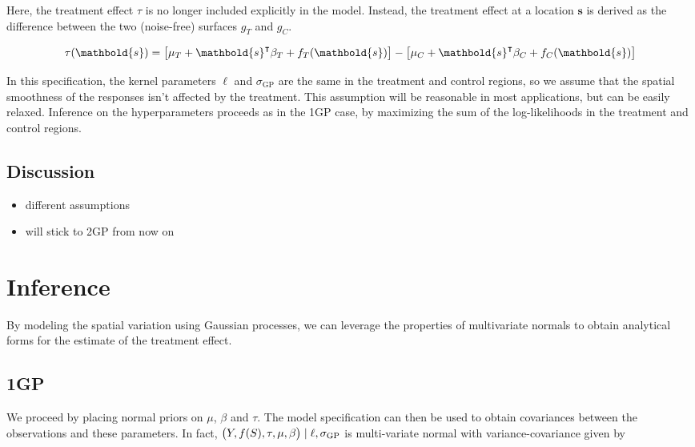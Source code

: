 \documentclass[letter]{article}
\providecommand{\tightlist}{%
      \setlength{\itemsep}{0pt}\setlength{\parskip}{0pt}}
\newcommand{\trans}{^{\intercal}}
\newcommand{\sigmaf}{\sigma_{\mathrm{GP}}}
\newcommand{\svec}{\mathbold{s}}
\providecommand{\tightlist}{%
  	  \setlength{\itemsep}{0pt}\setlength{\parskip}{0pt}}
\begin{document}
Here, the treatment effect \(\tau\) is no longer included explicitly in the model. Instead, the treatment effect at a location \(\svec\) is derived as the difference between the two (noise-free) surfaces \(g_T\) and \(g_C\).

\begin{equation}
\tau(\svec) = \sbr{\mu_T + \svec\trans\beta_T + f_T(\svec)} - \sbr{\mu_C + \svec\trans\beta_C + f_C(\svec)}
\end{equation}

In this specification, the kernel parameters \(\ell\) and \(\sigmaf\) are the same in the treatment and control regions, so we assume that the spatial smoothness of the responses isn't affected by the treatment. This assumption will be reasonable in most applications, but can be easily relaxed. Inference on the hyperparameters proceeds as in the 1GP case, by maximizing the sum of the log-likelihoods in the treatment and control regions.
    


    	\subsection{Discussion}\label{discussion}

\begin{itemize}
\tightlist
\item
  different assumptions
\item
  will stick to 2GP from now on
\end{itemize}
    


    	\section{Inference}\label{inference}

By modeling the spatial variation using Gaussian processes, we can leverage the properties of multivariate normals to obtain analytical forms for the estimate of the treatment effect.
    


    	\subsection{1GP}\label{gp}

We proceed by placing normal priors on \(\mu\), \(\beta\) and \(\tau\). The model specification can then be used to obtain covariances between the observations and these parameters. In fact, \(\del{Y,f(S),\tau,\mu,\beta} \mid \ell,\sigmaf\) is multi-variate normal with variance-covariance given by
\end{document}
